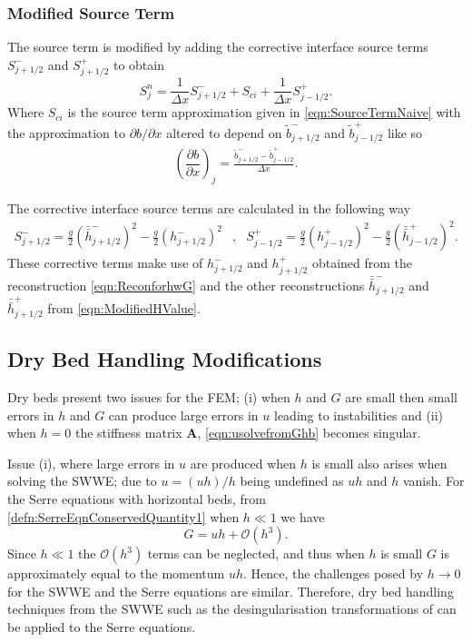 \documentclass[AMA,STIX1COL]{WileyNJD-v2}
\newcommand{\matr}[1]{\mathbf{#1}}
\begin{document}
\subsubsection{Modified Source Term}
The source term is modified by adding the corrective interface source terms $S^{-}_{j + 1/2}$ and $S^{+}_{j + 1/2}$ to obtain
\begin{equation*}
S^n_j =  \frac{1}{\Delta x}S^{-}_{j + 1/2} +  S_{ci} +  \frac{1}{\Delta x}S^{+}_{j - 1/2}.
\end{equation*}
Where $S_{ci}$ is the source term approximation given in \eqref{eqn:SourceTermNaive} with the approximation to $\partial b / \partial x$ altered to depend on $\tilde{b}^-_{j+1/2}$ and $\tilde{b}^+_{j-1/2}$ like so
\begin{align*}
\left(\dfrac{\partial {b}}{\partial x} \right)_{j} =  \frac{\tilde{b}^-_{j+1/2} - \tilde{b}^+_{j-1/2}}{\Delta x}.
\end{align*}

The corrective interface source terms are calculated in the following way
\begin{align*}
S^{-}_{j + 1/2} =  \frac{g}{2} \left(\bar{\bar{h}}^{-}_{j + 1/2} \right)^2 - \frac{g}{2} \left(h^{-}_{j + 1/2} \right)^2&,&
S^{+}_{j - 1/2} =  \frac{g}{2} \left(h^{+}_{j - 1/2}\right)^2 - \frac{g}{2}\left(\bar{\bar{h}}^{+}_{j - 1/2}\right)^2 .
\end{align*}
These corrective terms make use of $h^{-}_{j + 1/2}$ and $h^{+}_{j + 1/2}$ obtained from the reconstruction \eqref{eqn:ReconforhwG} and the other reconstructions $\bar{\bar{h}}^{-}_{j + 1/2}$ and $\bar{\bar{h}}^{+}_{j + 1/2}$ from \eqref{eqn:ModifiedHValue}. 

\subsection{Dry Bed Handling Modifications}
Dry beds present two issues for the FEM; (i) when $h$ and $G$ are small then small errors in $h$ and $G$ can produce large errors in $u$ leading to instabilities and  (ii) when $h=0$ the stiffness matrix $\matr{A}$, \eqref{eqn:usolvefromGhb} becomes singular.

Issue (i), where large errors in $u$ are produced when $h$ is small also arises when solving the SWWE; due to $u = (uh)/h $ being undefined as $u h $ and $h$ vanish. For the Serre equations with horizontal beds, from \eqref{defn:SerreEqnConservedQuantity1} when $h \ll 1$ we have
\begin{equation*}
G = uh + \mathcal{O}\left(h^3\right).
\end{equation*}
Since $h \ll 1$ the $\mathcal{O}\left(h^3\right)$ terms can be neglected, and thus when $h$ is small $G$ is approximately equal to the momentum $uh$. Hence, the challenges posed by $h \rightarrow 0$ for the SWWE and the Serre equations are similar. Therefore, dry bed handling techniques from the SWWE such as the desingularisation transformations of \citet{Kurganov-Petrova-2007-707} can be applied to the Serre equations. 
\end{document}
